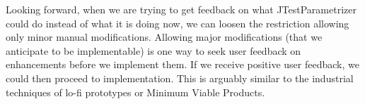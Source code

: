


Looking forward, when we are trying to get feedback on what JTestParametrizer could do instead of what it is doing now, we can loosen the restriction allowing only minor manual modifications. Allowing major modifications (that we anticipate to be implementable) is one way to seek user feedback on enhancements before we implement them. If we receive positive user feedback, we could then proceed to implementation. This is arguably similar to the industrial techniques of lo-fi prototypes or Minimum Viable Products.




